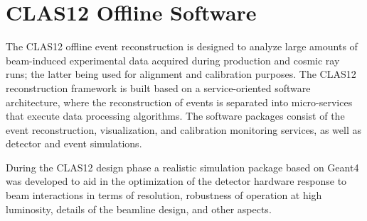 \documentclass[final,3p,twocolumn]{elsarticle}
\begin{document}
\section{CLAS12 Offline Software}  

The CLAS12 offline event reconstruction is designed to analyze large amounts of beam-induced experimental data
acquired during production and cosmic ray runs; the latter being used for alignment and calibration purposes. The
CLAS12 reconstruction framework is built based on a service-oriented software architecture, where the
reconstruction of events is separated into micro-services that execute data processing algorithms. The software
packages consist of the event reconstruction, visualization, and calibration monitoring services, as well as detector
and event simulations. 

During the CLAS12 design phase a realistic simulation package based on Geant4 was developed to aid in the
optimization of the detector hardware response to beam interactions in terms of resolution, robustness of operation
at high luminosity, details of the beamline design, and other aspects. 
\end{document}
